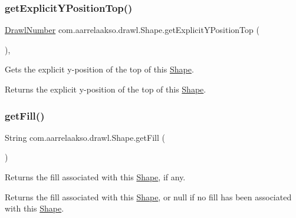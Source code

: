 \subsubsection{\texorpdfstring{get\+Explicit\+Y\+Position\+Top()}{getExplicitYPositionTop()}}
{\footnotesize\ttfamily \hyperlink{classcom_1_1aarrelaakso_1_1drawl_1_1_drawl_number}{Drawl\+Number} com.\+aarrelaakso.\+drawl.\+Shape.\+get\+Explicit\+Y\+Position\+Top (\begin{DoxyParamCaption}{ }\end{DoxyParamCaption})\hspace{0.3cm}{\ttfamily [protected]}, {\ttfamily [inherited]}}



Gets the explicit y-\/position of the top of this \hyperlink{classcom_1_1aarrelaakso_1_1drawl_1_1_shape}{Shape}. 

\begin{DoxyReturn}{Returns}
the explicit y-\/position of the top of this \hyperlink{classcom_1_1aarrelaakso_1_1drawl_1_1_shape}{Shape}. 
\end{DoxyReturn}
\mbox{\label{classcom_1_1aarrelaakso_1_1drawl_1_1_shape_a0d9a33a3e151aaceeec140bea343a650}} 
\subsubsection{\texorpdfstring{get\+Fill()}{getFill()}}
{\footnotesize\ttfamily String com.\+aarrelaakso.\+drawl.\+Shape.\+get\+Fill (\begin{DoxyParamCaption}{ }\end{DoxyParamCaption})\hspace{0.3cm}{\ttfamily [inherited]}}



Returns the fill associated with this \hyperlink{classcom_1_1aarrelaakso_1_1drawl_1_1_shape}{Shape}, if any. 

\begin{DoxyReturn}{Returns}
the fill associated with this \hyperlink{classcom_1_1aarrelaakso_1_1drawl_1_1_shape}{Shape}, or null if no fill has been associated with this \hyperlink{classcom_1_1aarrelaakso_1_1drawl_1_1_shape}{Shape}. 
\end{DoxyReturn}
\mbox{\label{classcom_1_1aarrelaakso_1_1drawl_1_1_shape_ac9f74d31c332aab76b329edc22080e67}} 
